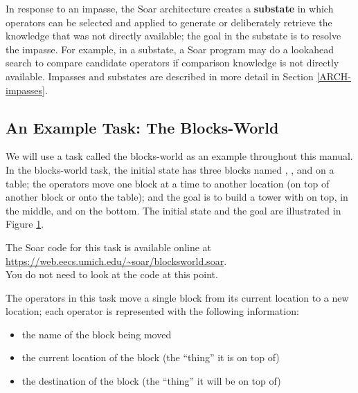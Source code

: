 In response to an impasse, the Soar architecture creates a \textbf{substate} in which operators can be selected and applied to generate or deliberately retrieve the knowledge that was not directly available; the goal in the substate is to resolve the impasse. For example, in a substate, a Soar program may do a lookahead search to compare candidate operators if comparison knowledge is not directly available.  Impasses and substates are described in more detail in Section \ref{ARCH-impasses}.


\subsection{An Example Task: The Blocks-World}

We will use a task called the blocks-world as an example throughout this manual. In the blocks-world task, the initial state has three blocks named , , and  on a table; the operators move one block at a time to another location (on top of another block or onto the table); and the goal is to build a tower with  on top,  in the middle, and  on the bottom. The initial state and the goal are illustrated in Figure \ref{fig:blocks}.

The Soar code for this task is available online at \\
\url{https://web.eecs.umich.edu/~soar/blocksworld.soar}. \\
You do not need to look at the code at this point.

\begin{figure}
	\label{fig:blocks}
\end{figure}

The operators in this task move a single block from its current location to a new location; each operator is represented with the following information:

\vspace{-12pt}
\begin{itemize}
	\item the name of the block being moved
	\vspace{-9pt}
	\item the current location of the block (the ``thing'' it is on top of)
	\vspace{-9pt}
	\item the destination of the block (the ``thing'' it will be on top of)
	\vspace{-9pt}
\end{itemize}

